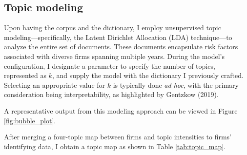\documentclass[12pt, letterpaper]{article}
\begin{document}

\subsection{Topic modeling}

Upon having the corpus and the dictionary, I employ unsupervised topic modeling—specifically, the Latent Dirichlet Allocation (LDA) technique—to analyze the entire set of documents. These documents encapsulate risk factors associated with diverse firms spanning multiple years. During the model's configuration, I designate a parameter to specify the number of topics, represented as \(k\), and supply the model with the dictionary I previously crafted. Selecting an appropriate value for \(k\) is typically done \textit{ad hoc}, with the primary consideration being interpretability, as highlighted by Gentzkow (2019).

A representative output from this modeling approach can be viewed in Figure \ref{fig:bubble_plot}.



After merging a four-topic map between firms and topic intensities to firms' identifying data, I obtain a topic map as shown in Table \ref{tab:topic_map}.

\tiny

\normalsize



\end{document}
